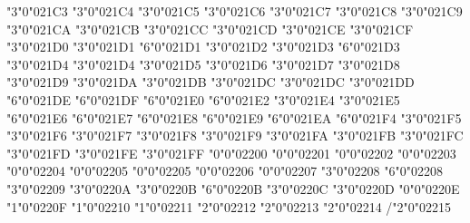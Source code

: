 \mchardef\downharpoonleft"3"0"021C3
\mchardef\rightleftarrows"3"0"021C4
\mchardef\updownarrows"3"0"021C5
\mchardef\leftrightarrows"3"0"021C6
\let\getsto\leftrightarrows
\mchardef\leftleftarrows"3"0"021C7
\mchardef\upuparrows"3"0"021C8
\mchardef\rightrightarrows"3"0"021C9
\mchardef\downdownarrows"3"0"021CA
\mchardef\leftrightharpoons"3"0"021CB
\mchardef\rightleftharpoons"3"0"021CC
\mchardef\nLeftarrow"3"0"021CD
\mchardef\nLeftrightarrow"3"0"021CE
\mchardef\nRightarrow"3"0"021CF
\mchardef\Leftarrow"3"0"021D0
\mchardef\Uparrow"3"0"021D1
\mchardef\Uparrowhead"6"0"021D1
\mchardef\Rightarrow"3"0"021D2
\mchardef\Downarrow"3"0"021D3
\mchardef\Downarrowhead"6"0"021D3
\mchardef\Leftrightarrow"3"0"021D4
\mchardef\iff"3"0"021D4
\mchardef\Updownarrow"3"0"021D5
\mchardef\Nwarrow"3"0"021D6
\mchardef\Nearrow"3"0"021D7
\mchardef\Searrow"3"0"021D8
\mchardef\Swarrow"3"0"021D9
\mchardef\Lleftarrow"3"0"021DA
\mchardef\Rrightarrow"3"0"021DB
\mchardef\leftzigzagarrow"3"0"021DC
\mchardef\longleftzigzagarrow"3"0"021DC
\mchardef\rightzigzagarrow"3"0"021DD
\let\leadsto\rightzigzagarrow
\mchardef\nHuparrow"6"0"021DE
\mchardef\nHdownarrow"6"0"021DF
\mchardef\leftdasharrowhead"6"0"021E0
\mchardef\rightdasharrowhead"6"0"021E2
\mchardef\barleftarrow"3"0"021E4
\mchardef\rightarrowbar"3"0"021E5
\mchardef\leftwhitearrow"6"0"021E6
\mchardef\upwhitearrow"6"0"021E7
\mchardef\rightwhitearrow"6"0"021E8
\mchardef\downwhitearrow"6"0"021E9
\mchardef\whitearrowupfrombar"6"0"021EA
\mchardef\circleonrightarrow"6"0"021F4
\let\arrowoncirc\circleonrightarrow
\mchardef\downuparrows"3"0"021F5
\mchardef\rightthreearrows"3"0"021F6
\mchardef\nvleftarrow"3"0"021F7
\mchardef\nvrightarrow"3"0"021F8
\mchardef\nvleftrightarrow"3"0"021F9
\mchardef\nVleftarrow"3"0"021FA
\mchardef\nVrightarrow"3"0"021FB
\mchardef\nVleftrightarrow"3"0"021FC
\mchardef\leftarrowtriangle"3"0"021FD
\mchardef\rightarrowtriangle"3"0"021FE
\mchardef\leftrightarrowtriangle"3"0"021FF
\mchardef\forall"0"0"02200
\mchardef\complement"0"0"02201
\mchardef\partial"0"0"02202
\mchardef\exists"0"0"02203
\mchardef\nexists"0"0"02204
\mchardef\varnothing"0"0"02205
\let\oslash\varnothing
\mchardef\emptyset"0"0"02205
\mchardef\increment"0"0"02206
\mchardef\nabla"0"0"02207
\mchardef\in"3"0"02208
\mchardef\varin"6"0"02208
\mchardef\notin"3"0"02209
\mchardef\smallin"3"0"0220A
\mchardef\ni"3"0"0220B
\mchardef\varni"6"0"0220B
\mchardef\nni"3"0"0220C
\mchardef\smallni"3"0"0220D
\mchardef\QED"0"0"0220E
\mchardef\prod"1"0"0220F
\mchardef\coprod"1"0"02210
\mchardef\sum"1"0"02211
\mchardef\minus"2"0"02212
\mchardef\mp"2"0"02213
\mchardef\dotplus"2"0"02214
\mchardef\slash"2"0"02215
